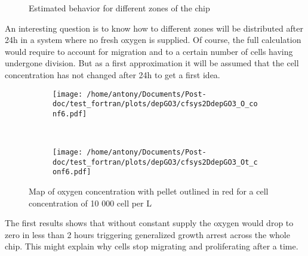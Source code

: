 \documentclass[11pt,a4paper]{article}
\begin{document}
\begin{figure}[ht!]
\vspace{1cm}
\hspace{4cm} 
\caption{Estimated behavior for different zones of the chip  \label{sum_O}}
\end{figure}

An interesting question is to know how to different zones will be distributed after 24h in a system where no fresh oxygen is supplied. Of course, the full calculation would require to account for migration and to a certain number of cells having undergone division. But as a first approximation it will be assumed that the cell concentration has not changed after 24h to get a first idea. 

\begin{figure}[ht!]
	\begin{subfigure}{0.45\textwidth}
	\centering
	\texttt{[image: /home/antony/Documents/Post-doc/test\_fortran/plots/depGO3/cfsys2DdepGO3\_O\_conf6.pdf]}
	\caption{ \label{O_conf5_ct}}
	\end{subfigure}
	~~
	\begin{subfigure}{0.45\textwidth}
	\texttt{[image: /home/antony/Documents/Post-doc/test\_fortran/plots/depGO3/cfsys2DdepGO3\_Ot\_conf6.pdf]}
		\caption{ \label{Ot_conf5}}
	\end{subfigure}
	\caption{Map of oxygen concentration with pellet outlined in red  \label{Oconf6} for a cell concentration of 10 000 cell per \textmu L }
\end{figure}

The first results shows that without constant supply the oxygen would drop to zero in less than 2 hours triggering generalized growth arrest across the whole chip. This might explain why cells stop migrating and proliferating after a time.
\end{document}
